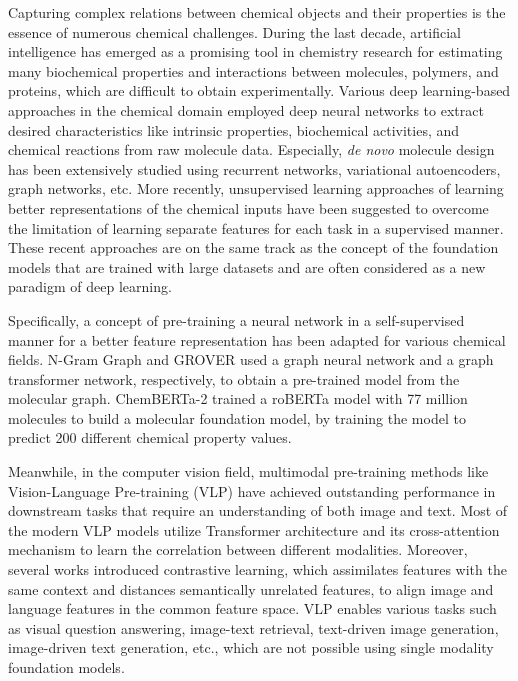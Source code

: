 \documentclass{nature_meth}
\newcommand{\1}{\blmath{1}}
\newcommand{\0}{\blmath{0}}
\begin{document}
Capturing complex relations between chemical objects and their properties is the essence of numerous chemical challenges.
During the last decade, artificial intelligence has emerged as a promising tool in chemistry research for estimating many biochemical properties and interactions between molecules, polymers, and proteins, which are difficult to obtain experimentally\cite{solubility, polymer, pignet}. Various deep learning-based approaches in the chemical domain employed deep neural networks to extract desired characteristics like intrinsic properties, biochemical activities, and chemical reactions from raw molecule data\cite{xu_2022,paul2020artificial,reaction}. Especially, {\em de novo} molecule design has been extensively studied using recurrent networks\cite{denovo_rnn}, variational autoencoders\cite{denovo_vae,lcj_denovo1}, graph networks\cite{lcj_denovo2}, etc\cite{denovo_transformer,denovo_rlold,denovo_rl}. More recently, unsupervised learning approaches of learning better representations of the chemical inputs have been suggested \cite{chemberta, pretrain-drug,antibody_pretrain} to overcome the limitation of learning separate features for each task in a supervised manner. These recent approaches are on the same track as the concept of the foundation models that are trained with large datasets and are often considered as a new paradigm of deep learning\cite{foundationmodel,chem_fm}. 

Specifically, a concept of pre-training a neural network in a self-supervised manner for a better feature representation has been adapted for various chemical fields\cite{pretrain-drug,antibody_pretrain,chemberta}. N-Gram Graph\cite{n-gram} and GROVER\cite{grover} used a graph neural network and a graph transformer network, respectively, to obtain a pre-trained model from the molecular graph. ChemBERTa-2 \cite{chemberta2} trained a roBERTa model with 77 million molecules to build a molecular foundation model, by training the model to predict 200 different chemical property values.

Meanwhile, in the computer vision field, multimodal pre-training methods like Vision-Language Pre-training (VLP)\cite{vlp_review} have achieved outstanding performance in downstream tasks that require an understanding of both image and  text. Most of the modern VLP models utilize Transformer\cite{transformer} architecture and its cross-attention mechanism to learn the correlation between different modalities\cite{uniter, oscar}. Moreover, several works introduced contrastive learning, which assimilates features with the same context and distances semantically unrelated features, to align image and language features in the common feature space\cite{clip, albef, coca}. VLP enables various tasks such as visual question answering\cite{vqa}, image-text retrieval\cite{retrieval_review}, text-driven image generation\cite{t2i_review}, image-driven text generation\cite{i2t_review}, etc., which are not possible using single modality foundation models.
\end{document}
